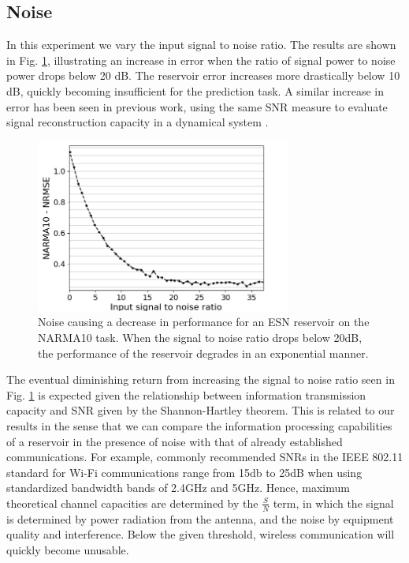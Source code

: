 \subsection{Noise}

In this experiment we vary the input signal to noise ratio. The results are
shown in Fig. \ref{input_noise_snr}, illustrating an increase in error when the
ratio of signal power to noise power drops below 20 dB. The reservoir error
increases more drastically below 10 dB, quickly becoming insufficient for the
prediction task. A similar increase in error has been seen in previous work,
using the same SNR measure to evaluate signal reconstruction capacity in a
dynamical system \cite{dambre_information_2012}.

\begin{figure}
  \centering
  \includegraphics[width=3.3in]{img/input_noise_snr.png}
  \caption{
    Noise causing a decrease in performance for an ESN reservoir on the NARMA10
task. When the signal to noise ratio drops below 20dB, the performance of the
reservoir degrades in an exponential manner.
  }
  \label{input_noise_snr}
\end{figure}

The eventual diminishing return from increasing the signal to noise ratio seen
in Fig. \ref{input_noise_snr} is expected given the relationship between
information transmission capacity and SNR given by the Shannon-Hartley
theorem. This is related to our results in the sense that we can compare the
information processing capabilities of a reservoir in the presence of noise with
that of already established communications. For example, commonly recommended
SNRs in the IEEE 802.11 standard for Wi-Fi communications range from 15db to
25dB when using standardized bandwidth bands of 2.4GHz and 5GHz. Hence, maximum
theoretical channel capacities are determined by the $\frac{S}{N}$ term, in
which the signal is determined by power radiation from the antenna, and the
noise by equipment quality and interference. Below the given threshold, wireless
communication will quickly become unusable.

